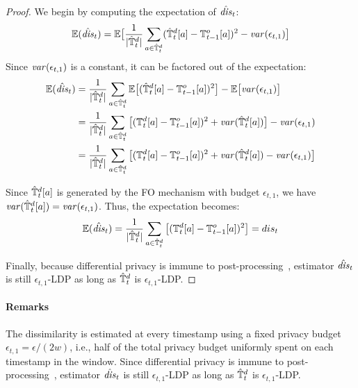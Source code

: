 \begin{proof}
We begin by computing the expectation of $\hat{\mathit{dis}}_t$:
\[
\mathbb{E}(\hat{\mathit{dis}}_t)
  = \mathbb{E}\big[ \frac{1}{|\hat{\mathbb{T}}^d_t|}
    \sum_{a\in\hat{\mathbb{T}}^d_t}(\hat{\mathbb{T}}^d_t[a]-\mathbb{T}^o_{t-1}[a])^2 - \mathit{var}(\epsilon_{t,1}) \big]
\]
Since $\mathit{var}(\epsilon_{t,1})$ is a constant, it can be factored out of the expectation:
\begin{align*}
  \mathbb{E}(\hat{\mathit{dis}}_t)
  &= \frac{1}{|\hat{\mathbb{T}}^d_t|}\sum_{a\in \hat{\mathbb{T}}^d_t} \mathbb{E}\big[
    (\hat{\mathbb{T}}^d_t[a] - \mathbb{T}^o_{t-1}[a])^2\big]  - \mathbb{E}\big[ \mathit{var}(\epsilon_{t,1}) \big] \\
  &= \frac{1}{|\hat{\mathbb{T}}^d_t|}\sum_{a\in \hat{\mathbb{T}}^d_t} \big[
    (\mathbb{T}^d_t[a] - \mathbb{T}^o_{t-1}[a])^2 + \mathit{var}(\hat{\mathbb{T}}^d_t[a])\big] - \mathit{var}(\epsilon_{t,1}) \\
  &= \frac{1}{|\hat{\mathbb{T}}^d_t|}\sum_{a\in \hat{\mathbb{T}}^d_t} \big[
    (\mathbb{T}^d_t[a] - \mathbb{T}^o_{t-1}[a])^2 + \mathit{var}(\hat{\mathbb{T}}^d_t[a]) - \mathit{var}(\epsilon_{t,1}) \big]
\end{align*}

Since $\hat{\mathbb{T}}^d_t[a]$ is generated by the FO mechanism with
budget $\epsilon_{t,1}$, we have $\mathit{var}(\hat{\mathbb{T}}^d_t[a])=\mathit{var}(\epsilon_{t,1})$. Thus, the expectation becomes:
\[
  \mathbb{E}(\hat{\mathit{dis}}_t)
  = \frac{1}{|\hat{\mathbb{T}}^d_t|}\sum_{a\in \hat{\mathbb{T}}^d_t} \big[
  (\mathbb{T}^d_t[a] - \mathbb{T}^o_{t-1}[a])^2 \big]
  = dis_t
\]

Finally, because differential privacy is immune to post-processing~\cite{Dwork2013},
estimator $\hat{\mathit{dis}}_t$ is still $\epsilon_{t,1}$-LDP as long as $\hat{\mathbb{T}}^d_t$ is
$\epsilon_{t,1}$-LDP.
\end{proof}

\paragraph{Remarks}
The dissimilarity is estimated at every timestamp using a fixed privacy budget
$\epsilon_{t,1}=\epsilon/(2w)$, i.e., half of the total privacy budget
uniformly spent on each timestamp in the window.
Since differential privacy is immune to post-processing~\cite{Dwork2013},
estimator $\hat{\mathit{dis}}_t$ is still $\epsilon_{t,1}$-LDP as long as $\hat{\mathbb{T}}^d_t$ is
$\epsilon_{t,1}$-LDP.
